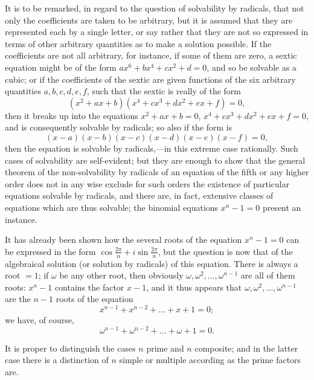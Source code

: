 \documentclass[11pt,a4paper]{book}
\begin{document}
It is to be remarked, in regard to the question of solvability by radicals, that not only the coefficients are taken to be arbitrary, but it is assumed that they are represented each by a single letter, or say rather that they are not so expressed in terms of other arbitrary quantities as to make a solution possible. If the coefficients are not all arbitrary, for instance, if some of them are zero, a sextic equation might be of the form $ax^{6} + bx^{4} + cx^{2} + d = 0$, and so be solvable as a cubic; or if the coefficients of the sextic are given functions of the six arbitrary quantities $a, b, c, d, e, f$, such that the sextic is really of the form
\[
(x^{2} + ax + b)(x^{4} + cx^{3} + dx^{2} + ex + f) = 0,
\]
then it breaks up into the equations $x^{2} + ax + b = 0$, $x^{4} + cx^{3} + dx^{2} + ex + f = 0$, and is consequently solvable by radicals; so also if the form is
\[
(x - a)(x - b)(x - c)(x - d)(x - e)(x - f) = 0,
\]
then the equation is solvable by radicals,---in this extreme case rationally. Such cases of solvability are self-evident; but they are enough to show that the general theorem of the non-solvability by radicals of an equation of the fifth or any higher order does not in any wise exclude for such orders the existence of particular equations solvable by radicals, and there are, in fact, extensive classes of equations which are thus solvable; the binomial equations $x^{n} - 1 = 0$ present an instance.

It has already been shown how the several roots of the equation $x^{n} - 1 = 0$ can be expressed in the form $\cos\frac{2\pi}{n} + i\sin\frac{2\pi}{n}$, but the question is now that of the algebraical solution (or solution by radicals) of this equation. There is always a root $= 1$; if $\omega$ be any other root, then obviously $\omega, \omega^{2}, \ldots, \omega^{n-1}$ are all of them roots: $x^{n} - 1$ contains the factor $x - 1$, and it thus appears that $\omega, \omega^{2}, \ldots, \omega^{n-1}$ are the $n - 1$ roots of the equation
\[
x^{n-1} + x^{n-2} + \ldots + x + 1 = 0;
\]
we have, of course,
\[
\omega^{n-1} + \omega^{n-2} + \ldots + \omega + 1 = 0.
\]

It is proper to distinguish the cases $n$ prime and $n$ composite; and in the latter case there is a distinction of $n$ simple or multiple according as the prime factors are.
\end{document}
